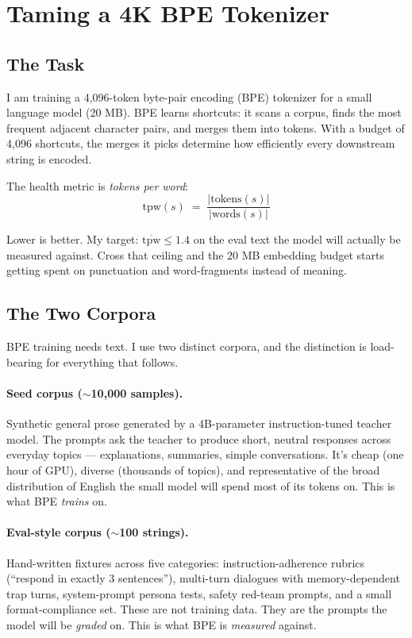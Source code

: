 \section{Taming a 4K BPE Tokenizer}

\subsection*{The Task}

I am training a 4{,}096-token byte-pair encoding (BPE) tokenizer for a
small language model (20 MB). BPE learns shortcuts: it scans a corpus, finds the
most frequent adjacent character pairs, and merges them into tokens. With
a budget of 4{,}096 shortcuts, the merges it picks determine how
efficiently every downstream string is encoded.

The health metric is \textit{tokens per word}:
\[
    \text{tpw}(s) \;=\; \frac{|\text{tokens}(s)|}{|\text{words}(s)|}
\]

Lower is better. My target: $\overline{\text{tpw}} \leq 1.4$ on the eval
text the model will actually be measured against. Cross that ceiling and
the 20 MB embedding budget starts getting spent on punctuation and
word-fragments instead of meaning.

\subsection*{The Two Corpora}

BPE training needs text. I use two distinct corpora, and the distinction
is load-bearing for everything that follows.

\paragraph{Seed corpus ($\sim$10{,}000 samples).} Synthetic general prose
generated by a 4B-parameter instruction-tuned teacher model. The prompts
ask the teacher to produce short, neutral responses across everyday
topics --- explanations, summaries, simple conversations. It's cheap
(one hour of GPU), diverse (thousands of topics), and representative of
the broad distribution of English the small model will spend most of
its tokens on. This is what BPE \emph{trains} on.

\paragraph{Eval-style corpus ($\sim$100 strings).} Hand-written fixtures
across five categories: instruction-adherence rubrics (``respond in
exactly 3 sentences''), multi-turn dialogues with memory-dependent
trap turns, system-prompt persona tests, safety red-team prompts, and a
small format-compliance set. These are not training data. They are the
prompts the model will be \emph{graded} on. This is what BPE is
\emph{measured} against.

